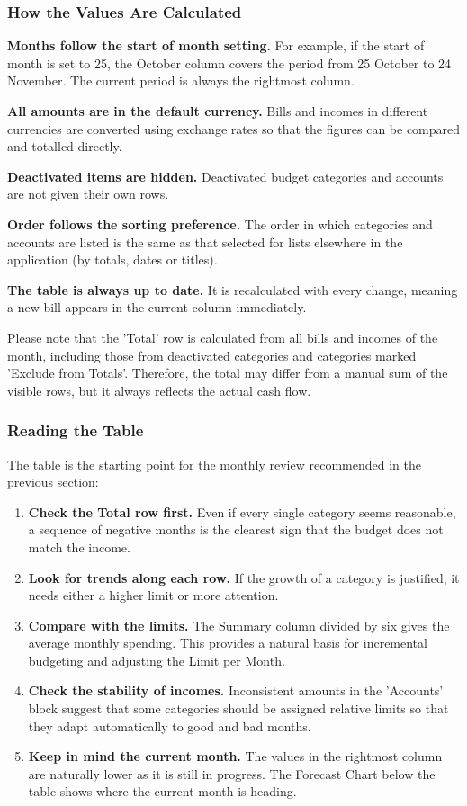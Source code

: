 \subsubsection{How the Values Are Calculated}

\textbf{Months follow the start of month setting.} For example, if the start of month is set
to 25, the October column covers the period from 25 October to 24 November. The current
period is always the rightmost column.

\textbf{All amounts are in the default currency.} Bills and incomes in different currencies
are converted using exchange rates so that the figures can be compared and totalled directly.

\textbf{Deactivated items are hidden.} Deactivated budget categories and accounts are not
given their own rows.

\textbf{Order follows the sorting preference.} The order in which categories and accounts are
listed is the same as that selected for lists elsewhere in the application (by totals, dates
or titles).

\textbf{The table is always up to date.} It is recalculated with every change, meaning a new
bill appears in the current column immediately.

\noindent Please note that the 'Total' row is calculated from all bills and incomes of the
month, including those from deactivated categories and categories marked 'Exclude from
Totals'. Therefore, the total may differ from a manual sum of the visible rows, but it always
reflects the actual cash flow.


\subsubsection{Reading the Table}

The table is the starting point for the monthly review recommended in the previous section:

\begin{enumerate}
  \item \textbf{Check the Total row first.} Even if every single category seems reasonable, a
  sequence of negative months is the clearest sign that the budget does not match the income.
  \item \textbf{Look for trends along each row.} If the growth of a category is justified, it
  needs either a higher limit or more attention.
  \item \textbf{Compare with the limits.} The Summary column divided by six gives the average
  monthly spending. This provides a natural basis for incremental budgeting and adjusting the
  Limit per Month.
  \item \textbf{Check the stability of incomes.} Inconsistent amounts in the 'Accounts' block
  suggest that some categories should be assigned relative limits so that they adapt
  automatically to good and bad months.
  \item \textbf{Keep in mind the current month.} The values in the rightmost column are
  naturally lower as it is still in progress. The Forecast Chart below the table shows where
  the current month is heading.
\end{enumerate}
